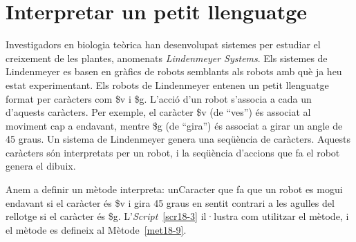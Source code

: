 \section{Interpretar un petit llenguatge}
Investigadors en biologia teòrica han desenvolupat sistemes per estudiar el creixement de les plantes, anomenats \emph{Lindenmeyer Systems}. Els sistemes de Lindenmeyer es basen en gràfics de robots semblants als robots amb què ja heu estat experimentant. Els robots de Lindenmeyer entenen un petit llenguatge format per caràcters com \textsf{\$v} i \textsf{\$g}. L'acció d'un robot s'associa a cada un d'aquests caràcters. Per exemple, el caràcter \textsf{\$v} (de ``ves'') és associat al moviment cap a endavant, mentre \textsf{\$g} (de ``gira'') és associat a girar un angle de 45 graus. Un sistema de Lindenmeyer genera una seqüència de caràcters. Aquests caràcters són interpretats per un robot, i la seqüència d'accions que fa el robot genera el dibuix. 

Anem a definir un mètode \textsf{interpreta: unCaracter} que fa que un robot es mogui endavant si el caràcter és \textsf{\$v} i gira 45 graus en sentit contrari a les agulles del rellotge si el caràcter és \textsf{\$g}. L'\emph{Script}~\ref{scr18-3} il·lustra com utilitzar el mètode, i el mètode es defineix al Mètode~\ref{met18-9}. 


